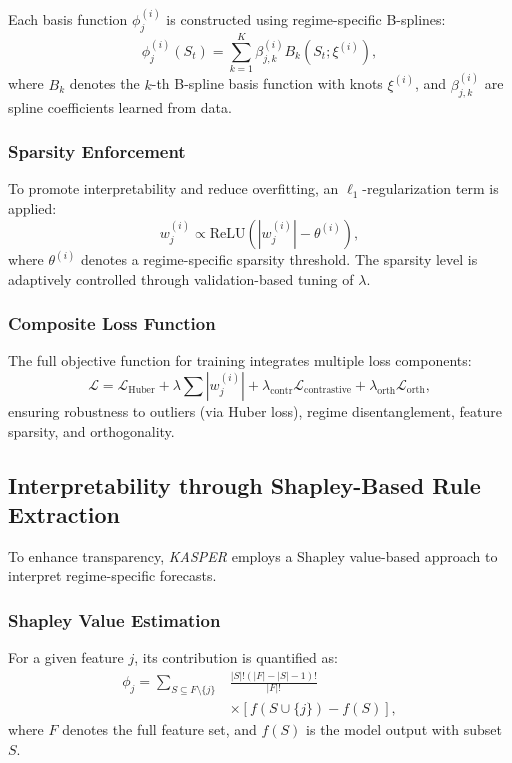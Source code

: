 \documentclass[conference,10pt]{IEEEtran}
\begin{document}
Each basis function $\phi_j^{(i)}$ is constructed using regime-specific B-splines:
\begin{equation}
\phi_j^{(i)}(S_t) = \sum_{k=1}^K \beta_{j,k}^{(i)} B_k(S_t; \xi^{(i)}),
\end{equation}
where $B_k$ denotes the $k$-th B-spline basis function with knots $\xi^{(i)}$, and $\beta_{j,k}^{(i)}$ are spline coefficients learned from data.

\subsubsection{Sparsity Enforcement}

To promote interpretability and reduce overfitting, an $\ell_1$-regularization term is applied:
\begin{equation}
w_j^{(i)} \propto \text{ReLU} (|w_j^{(i)}| - \theta^{(i)}),
\end{equation}
where $\theta^{(i)}$ denotes a regime-specific sparsity threshold. The sparsity level is adaptively controlled through validation-based tuning of $\lambda$.

\subsubsection{Composite Loss Function}

The full objective function for training integrates multiple loss components:
\begin{equation}
\mathcal{L} = \mathcal{L}_{\text{Huber}} + \lambda \sum |w_j^{(i)}| + \lambda_{\text{contr}} \mathcal{L}_{\text{contrastive}} + \lambda_{\text{orth}} \mathcal{L}_{\text{orth}},
\end{equation}
ensuring robustness to outliers (via Huber loss), regime disentanglement, feature sparsity, and orthogonality.

\subsection{Interpretability through Shapley-Based Rule Extraction}

To enhance transparency, \textit{KASPER} employs a Shapley value-based approach to interpret regime-specific forecasts.

\subsubsection{Shapley Value Estimation}
For a given feature $j$, its contribution is quantified as:
\begin{align}
\phi_j = \sum_{S \subseteq F \setminus \{j\}} & \frac{|S|!(|F|-|S|-1)!}{|F|!} \nonumber \\
& \times \left[ f(S \cup \{j\}) - f(S) \right],
\end{align}
where $F$ denotes the full feature set, and $f(S)$ is the model output with subset $S$.
\end{document}
